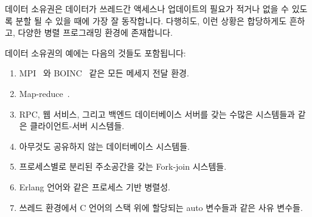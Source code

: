 데이터 소유권은 데이터가 쓰레드간 액세스나 업데이트의 필요가 적거나 없을 수
있도록 분할 될 수 있을 때에 가장 잘 동작합니다.
다행히도, 이런 상황은 합당하게도 흔하고, 다양한 병렬 프로그래밍 환경에
존재합니다.

데이터 소유권의 예에는 다음의 것들도 포함됩니다:
\iffalse

Data ownership works best when the data can be partitioned so that there
is little or no need for cross thread access or update.
Fortunately, this situation is reasonably common, and in a wide variety
of parallel-programming environments.

Examples of data ownership include:
\fi

\begin{enumerate}
\item	MPI~\cite{MPIForum2008} 와 BOINC~\cite{BOINC2008} 같은 모든 메세지 전달
	환경.
\item	Map-reduce~\cite{MapReduce2008MIT}.
\item	RPC, 웹 서비스, 그리고 백엔드 데이터베이스 서버를 갖는 수많은
	시스템들과 같은 클라이언트-서버 시스템들.
\item	아무것도 공유하지 않는 데이터베이스 시스템들.
\item	프로세스별로 분리된 주소공간을 갖는 Fork-join 시스템들.
\item	Erlang 언어와 같은 프로세스 기반 병렬성.
\item	쓰레드 환경에서 C 언어의 스택 위에 할당되는 auto 변수들과 같은 사유
	변수들.
\iffalse

\item	All message-passing environments, such as MPI~\cite{MPIForum2008}
	and BOINC~\cite{BOINC2008}.
\item	Map-reduce~\cite{MapReduce2008MIT}.
\item	Client-server systems, including RPC, web services, and
	pretty much any system with a back-end database server.
\item	Shared-nothing database systems.
\item	Fork-join systems with separate per-process address spaces.
\item	Process-based parallelism, such as the Erlang language.
\item	Private variables, for example, C-language on-stack auto variables,
	in threaded environments.
\item	Many parallel linear-algebra algorithms, especially those
	well-suited for GPGPUs.\footnote{
		But note that a great many other classes of applications
		have been ported to
		GPGPUs~\cite{NormMatloff2013ParProcBook,AMD2017OpenCL,NVidia2017GPGPU,NVidia2017GPGPU-university}.}
\fi
\end{enumerate}

